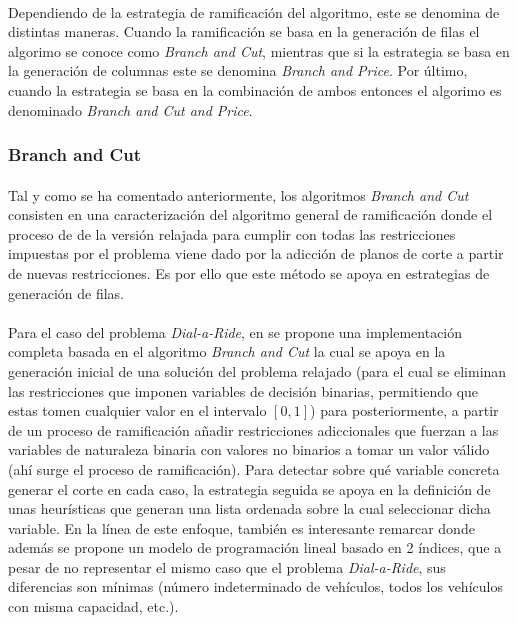 \documentclass{subfiles}
\begin{document}
        \paragraph{}
        Dependiendo de la estrategia de ramificación del algoritmo, este se denomina de distintas maneras. Cuando la ramificación se basa en la generación de filas el algorimo se conoce como \emph{Branch and Cut}, mientras que si la estrategia se basa en la generación de columnas este se denomina \emph{Branch and Price}. Por último, cuando la estrategia se basa en la combinación de ambos entonces el algorimo es denominado \emph{Branch and Cut and Price}.

        \subsubsection{Branch and Cut}
        \label{sec:solving_branch_cut}

          \paragraph{}
          Tal y como se ha comentado anteriormente, los algoritmos \emph{Branch and Cut} consisten en una caracterización del algoritmo general de ramificación donde el proceso de  de la versión relajada para cumplir con todas las restricciones impuestas por el problema viene dado por la adicción de planos de corte a partir de nuevas restricciones. Es por ello que este método se apoya en estrategias de generación de filas.

          \paragraph{}
          Para el caso del problema \emph{Dial-a-Ride}, en \cite{cordeau2006branch} se propone una implementación completa basada en el algoritmo \emph{Branch and Cut} la cual se apoya en la generación inicial de una solución del problema relajado (para el cual se eliminan las restricciones que imponen variables de decisión binarias, permitiendo que estas tomen cualquier valor en el intervalo $[0, 1]$) para posteriormente, a partir de un proceso de ramificación añadir restricciones adiccionales que fuerzan a las variables de naturaleza binaria con valores no binarios a tomar un valor válido (ahí surge el proceso de ramificación). Para detectar sobre qué variable concreta generar el corte en cada caso, la estrategia seguida se apoya en la definición de unas heurísticas que generan una lista ordenada sobre la cual seleccionar dicha variable. En la línea de este enfoque, también es interesante remarcar \cite{ropke2007models} donde además se propone un modelo de programación lineal basado en 2 índices, que a pesar de no representar el mismo caso que el problema \emph{Dial-a-Ride}, sus diferencias son mínimas (número indeterminado de vehículos, todos los vehículos con misma capacidad, etc.).
\end{document}
